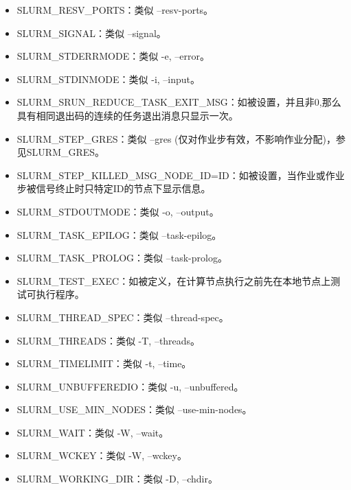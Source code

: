 \begin{itemize}
	\item SLURM\_RESV\_PORTS：类似 --resv-ports。
	\item SLURM\_SIGNAL：类似 --signal。
	\item SLURM\_STDERRMODE：类似 -e, --error。
	\item SLURM\_STDINMODE：类似 -i, --input。
	\item SLURM\_SRUN\_REDUCE\_TASK\_EXIT\_MSG：如被设置，并且非0,那么具有相同退出码的连续的任务退出消息只显示一次。
	\item SLURM\_STEP\_GRES：类似 --gres (仅对作业步有效，不影响作业分配)，参见SLURM\_GRES。
	\item SLURM\_STEP\_KILLED\_MSG\_NODE\_ID=ID：如被设置，当作业或作业步被信号终止时只特定ID的节点下显示信息。
	\item SLURM\_STDOUTMODE：类似 -o, --output。
	\item SLURM\_TASK\_EPILOG：类似 --task-epilog。
	\item SLURM\_TASK\_PROLOG：类似 --task-prolog。
	\item SLURM\_TEST\_EXEC：如被定义，在计算节点执行之前先在本地节点上测试可执行程序。
	\item SLURM\_THREAD\_SPEC：类似 --thread-spec。
	\item SLURM\_THREADS：类似 -T, --threads。
	\item SLURM\_TIMELIMIT：类似 -t, --time。
	\item SLURM\_UNBUFFEREDIO：类似 -u, --unbuffered。
	\item SLURM\_USE\_MIN\_NODES：类似 --use-min-nodes。
	\item SLURM\_WAIT：类似 -W, --wait。
	\item SLURM\_WCKEY：类似 -W, --wckey。
	\item SLURM\_WORKING\_DIR：类似 -D, --chdir。
\end{itemize}

